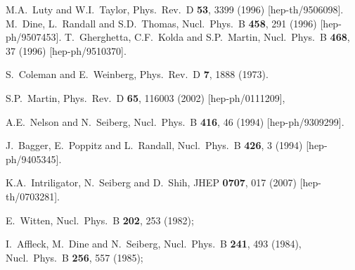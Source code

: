 \documentclass[11pt]{article}
\begin{document}
\begin{thebibliography}{999}
M.A.~Luty and W.I.~Taylor,
  Phys.\ Rev.\ D {\bf 53}, 3399 (1996)
  [hep-th/9506098].
M.~Dine, L.~Randall and S.D.~Thomas,
  Nucl.\ Phys.\ B {\bf 458}, 291 (1996)
  [hep-ph/9507453].
T.~Gherghetta, C.F.~Kolda and S.P.~Martin,
  Nucl.\ Phys.\ B {\bf 468}, 37 (1996)
  [hep-ph/9510370].

S.~Coleman and E.~Weinberg,
  Phys.\ Rev.\ D {\bf 7}, 1888 (1973).

S.P.~Martin,
  Phys.\ Rev.\ D {\bf 65}, 116003 (2002)
  [hep-ph/0111209],

  A.E.~Nelson and N.~Seiberg,
  Nucl.\ Phys.\  B {\bf 416}, 46 (1994)
  [hep-ph/9309299].
  
J.~Bagger, E.~Poppitz and L.~Randall,
  Nucl.\ Phys.\  B {\bf 426}, 3 (1994)
  [hep-ph/9405345].

  K.A.~Intriligator, N.~Seiberg and D.~Shih,
  JHEP {\bf 0707}, 017 (2007)
  [hep-th/0703281].

E.~Witten, 
  Nucl.\ Phys.\ B {\bf 202}, 253 (1982);

I.~Affleck, M.~Dine and N.~Seiberg, 
  Nucl.\ Phys.\ B {\bf 241}, 493 (1984),
  Nucl.\ Phys.\ B {\bf 256}, 557 (1985);



\end{thebibliography}
\end{document}
